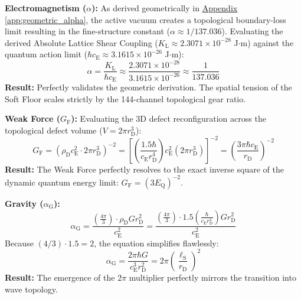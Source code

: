 \vspace{0.2em}
\noindent \textbf{Electromagnetism ($\alpha$):} As derived geometrically in \hyperref[app:geometric_alpha]{Appendix \ref*{app:geometric_alpha}}, the active vacuum creates a topological boundary-loss limit resulting in the fine-structure constant ($\alpha \approx 1/137.036$). Evaluating the derived Absolute Lattice Shear Coupling ($K_{\mathrm{L}} \approx 2.3071 \times 10^{-28}$ J$\cdot$m) against the quantum action limit ($\hbar c_{\mathrm{E}} \approx 3.1615 \times 10^{-26}$ J$\cdot$m):
\begin{equation}
    \alpha = \frac{K_{\mathrm{L}}}{\hbar c_{\mathrm{E}}} \approx \frac{2.3071 \times 10^{-28}}{3.1615 \times 10^{-26}} \approx \frac{1}{137.036}
\end{equation}
\noindent \textbf{Result:} Perfectly validates the geometric derivation. The spatial tension of the Soft Floor scales strictly by the 144-channel topological gear ratio.

\vspace{0.2em}
\noindent \textbf{Weak Force ($G_{\mathrm{F}}$):} Evaluating the 3D defect reconfiguration across the topological defect volume ($V = 2\pi r_{\mathrm{D}}^3$):
\begin{equation}
    G_{\mathrm{F}} = (\rho_{\mathrm{D}} c_{\mathrm{E}}^2 \cdot 2\pi r_{\mathrm{D}}^3)^{-2} = \left[ \left(\frac{1.5\hbar}{c_{\mathrm{E}} r_{\mathrm{D}}^4}\right) c_{\mathrm{E}}^2 (2\pi r_{\mathrm{D}}^3) \right]^{-2} = \left(\frac{3\pi\hbar c_{\mathrm{E}}}{r_{\mathrm{D}}}\right)^{-2}
\end{equation}
\noindent \textbf{Result:} The Weak Force perfectly resolves to the exact inverse square of the dynamic quantum energy limit: $G_{\mathrm{F}} = (3 E_{\mathrm{Q}})^{-2}$.

\vspace{0.2em}
\noindent \textbf{Gravity ($\alpha_{\mathrm{G}}$):}
\begin{equation}
    \alpha_{\mathrm{G}} = \frac{\left(\frac{4\pi}{3}\right) \cdot \rho_{\mathrm{D}} G r_{\mathrm{D}}^2}{c_{\mathrm{E}}^2} = \frac{\left(\frac{4\pi}{3}\right) \cdot 1.5 \left(\frac{\hbar}{c_{\mathrm{E}} r_{\mathrm{D}}^4}\right) G r_{\mathrm{D}}^2}{c_{\mathrm{E}}^2}
\end{equation}
Because $(4/3) \cdot 1.5 = 2$, the equation simplifies flawlessly:
\begin{equation}
    \alpha_{\mathrm{G}} = \frac{2\pi\hbar G}{c_{\mathrm{E}}^3 r_{\mathrm{D}}^2} = 2\pi \left(\frac{\ell_{\mathrm{S}}}{r_{\mathrm{D}}}\right)^2
\end{equation}
\noindent \textbf{Result:} The emergence of the $2\pi$ multiplier perfectly mirrors the transition into wave topology.

